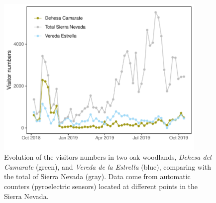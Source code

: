 \begin{figure}
    \centering
    \includegraphics[width=0.9\textwidth]{img/es/es-visitorsprofile.pdf}\caption{Evolution of the visitors numbers in two oak woodlands, \emph{Dehesa del Camarate} (green), and \emph{Vereda de la Estrella} (blue), comparing with the total of Sierra Nevada (gray). Data come from automatic counters (pyroelectric sensors) located at different points in the Sierra Nevada.}\label{fig:es:visitorsprofile}
\end{figure}

